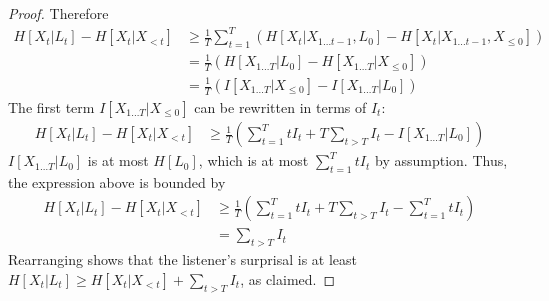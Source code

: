 \documentclass[11pt,letterpaper]{article}
\begin{document}
\begin{proof}
	


Therefore
\begin{align*}
	H[X_t | L_t] - H[X_t | X_{<t}]& \geq \frac{1}{T} \sum_{t=1}^T ( H[X_t|X_{1\dots t-1}, L_0] - H[X_t | X_{1\dots t-1}, X_{\leq 0}]  )    \\
	& = \frac{1}{T} \left(H[X_{1\dots T} | L_0] - H[X_{1\dots T} | X_{\leq 0}]\right)  \\
	& = \frac{1}{T} \left(I[X_{1\dots T}|X_{\leq 0}] - I[X_{1\dots T}|L_0]\right) 
\end{align*}
	The first term $I[X_{1\dots T}|X_{\leq 0}]$ can be rewritten in terms of $I_t$:
\begin{align*}
	H[X_t | L_t] - H[X_t | X_{<t}]& \geq \frac{1}{T} \left(\sum_{t=1}^T t I_t + T \sum_{t > T} I_t - I[X_{1\dots T}|L_0]\right) 
\end{align*}
	$I[X_{1\dots T}|L_0]$ is at most $H[L_0]$, which is at most $\sum_{t=1}^T t I_t$ by assumption. Thus, the expression above is bounded by
	\begin{align*}
	H[X_t | L_t] - H[X_t | X_{<t}]& \geq \frac{1}{T} \left(\sum_{t=1}^T t I_t + T \sum_{t > T} I_t - \sum_{t=1}^T t I_t\right) \\
		&= \sum_{t > T} I_t
\end{align*}
	Rearranging shows that the listener's surprisal is at least $H[X_t|L_t] \geq H[X_t | X_{<t}] + \sum_{t > T} I_t$, as claimed.
\end{proof}
\end{document}
